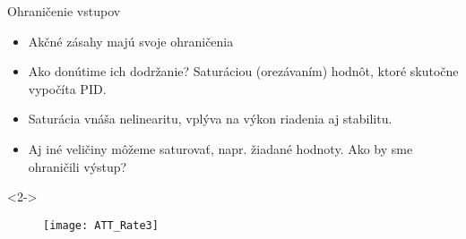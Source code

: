 \begin{frame}[t]{Ohraničenie vstupov}
  \begin{itemize}
    \item<1-> Akčné zásahy majú svoje ohraničenia 
    \item<2-> Ako donútime ich dodržanie? Saturáciou (orezávaním) hodnôt, ktoré skutočne vypočíta PID.
    \item<3-> Saturácia vnáša nelinearitu, vplýva na výkon riadenia aj stabilitu.
    \item<4-> Aj iné veličiny môžeme saturovať, napr. žiadané hodnoty. Ako by sme ohraničili výstup?
  \end{itemize}

    \begin{onlyenv}<2->
  \begin{figure}
\centering
  \texttt{[image: ATT\_Rate3]}\\
\end{figure}
\end{onlyenv}
\end{frame}


